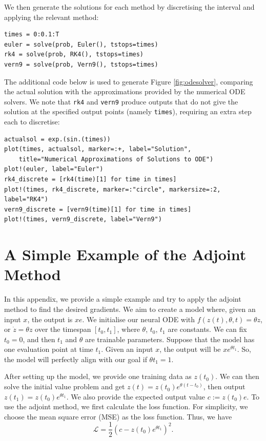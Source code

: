 \documentclass[a4paper,11pt,titlepage]{article}
\theoremstyle{definition}
\theoremstyle{plain}
\theoremstyle{remark}
\begin{document}
We then generate the solutions for each method by discretising the interval and applying the relevant method:
\begin{verbatim}
times = 0:0.1:T
euler = solve(prob, Euler(), tstops=times)
rk4 = solve(prob, RK4(), tstops=times)
vern9 = solve(prob, Vern9(), tstops=times)
\end{verbatim}

The additional code below is used to generate Figure \ref{fig:odesolver}, comparing the actual solution with the approximations provided by the numerical ODE solvers. We note that \texttt{rk4} and \texttt{vern9} produce outputs that do not give the solution at the specified output points (namely \texttt{times}), requiring an extra step each to discretise:
\begin{verbatim}
actualsol = exp.(sin.(times))
plot(times, actualsol, marker=:+, label="Solution", 
    title="Numerical Approximations of Solutions to ODE")
plot!(euler, label="Euler")
rk4_discrete = [rk4(time)[1] for time in times]
plot!(times, rk4_discrete, marker=:"circle", markersize=:2, label="RK4")
vern9_discrete = [vern9(time)[1] for time in times]
plot!(times, vern9_discrete, label="Vern9")
\end{verbatim}

\pagebreak
\section{A Simple Example of the Adjoint Method}
\label{sec:adjmethod}

In this appendix, we provide a simple example and try to apply the adjoint method to find the desired gradients. We aim to create a model where, given an input $x$, the output is $xe$. We initialise our neural ODE with $f(z(t),\theta,t)=\theta z$, or $\dot{z}=\theta z$ over the timespan $[t_0,t_1]$, where $\theta$, $t_0$, $t_1$ are constants. We can fix $t_0 = 0$, and then $t_1$ and $\theta$ are trainable parameters. Suppose that the model has one evaluation point at time $t_1$. Given an input $x$, the output will be $xe^{\theta t_1}$. So, the model will perfectly align with our goal if $\theta t_1=1$.

After setting up the model, we provide one training data as $z(t_0)$. We can then solve the initial value problem and get $z(t) = z(t_0)e^{\theta(t-t_0)}$, then output $z(t_1)=z(t_0)e^{\theta t_1}$. We also provide the expected output value $c:=z(t_0)e$.
To use the adjoint method, we first calculate the loss function. For simplicity, we choose the mean square error (MSE) as the loss function. Thus, we have
$$\mathcal{L} = \frac{1}{2}\left(c-z(t_0)e^{\theta t_1}\right)^2.$$
\end{document}
